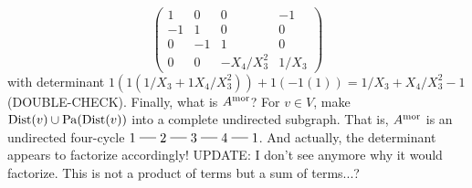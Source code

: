 {\begin{Eg}
$$\begin{pmatrix}
  1  &  0 & 0 & -1 \\
  -1 &  1 & 0 & 0  \\
  0  & -1 & 1 & 0  \\
  0  &  0 & - X_4 / X_3^2 & 1/X_3 
\end{pmatrix}$$
with determinant $1 (1 (1/X_3 + 1 X_4/X_3^2)) + 1 (-1 (1)) = 1/X_3 + X_4/X_3^2 - 1$ (DOUBLE-CHECK).
Finally, what is $A^{\mathrm{mor}}$?
For $v \in V$, make $\mathrm{Dist}(v) \cup \mathrm{Pa}(\mathrm{Dist}(v))$ into a complete undirected subgraph.
That is, $A^{\mathrm{mor}}$ is an undirected four-cycle $1 \tut 2 \tut 3 \tut 4 \tut 1$.
And actually, the determinant appears to factorize accordingly!
UPDATE: I don't see anymore why it would factorize. This is not a product of terms but a sum of terms...?
\end{Eg}}

